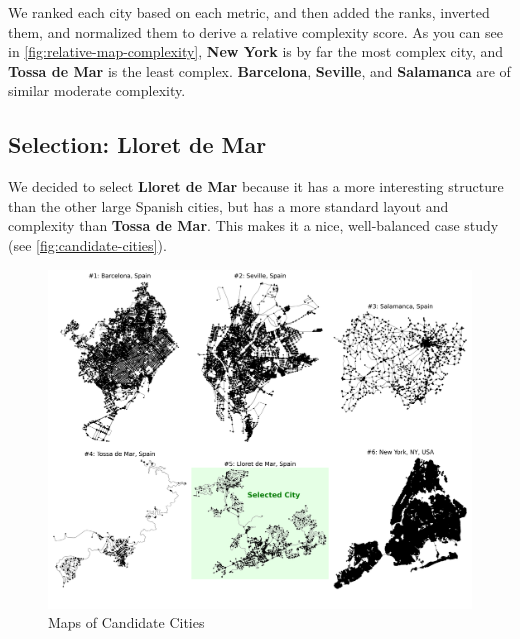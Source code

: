 We ranked each city based on each metric, and then added the ranks, inverted them,
and normalized them to derive a relative complexity score.
As you can see in \autoref{fig:relative-map-complexity},
\textbf{New York} is by far the most complex city, and \textbf{Tossa de Mar} is the least complex.
\textbf{Barcelona}, \textbf{Seville}, and \textbf{Salamanca} are of similar moderate complexity.

\subsection{Selection: Lloret de Mar}

We decided to select \textbf{Lloret de Mar} because it has a more interesting structure
than the other large Spanish cities, but has a more standard layout and
complexity than \textbf{Tossa de Mar}. This makes it a nice, well-balanced case study (see \autoref{fig:candidate-cities}).

\begin{figure}[H]
    \centering
    \includegraphics[width=\textwidth]{../figures/maps_of_candidate_cities.png}
    \caption{Maps of Candidate Cities}
    \label{fig:candidate-cities}
\end{figure}